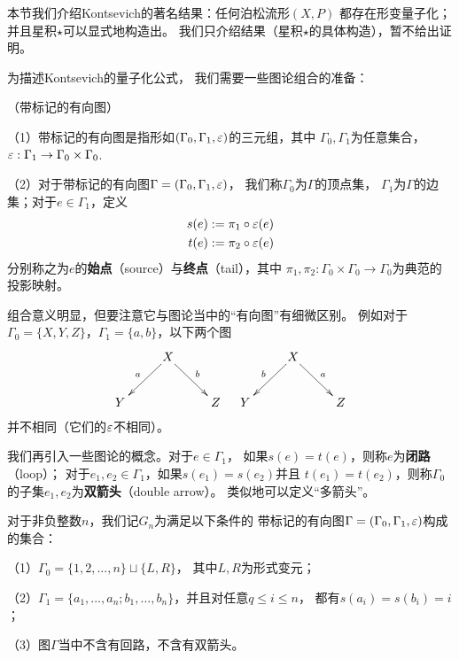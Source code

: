 本节我们介绍Kontsevich的著名结果：任何泊松流形$(X,P)$
都存在形变量子化；并且星积$\star$可以显式地构造出。
我们只介绍结果（星积$\star$的具体构造），暂不给出证明。


为描述Kontsevich的量子化公式，
我们需要一些图论组合的准备：

\begin{definition}（带标记的有向图）

（1）带标记的有向图是指形如$(\Gamma_0,\Gamma_1,\varepsilon)$的三元组，其中
$\Gamma_0,\Gamma_1$为任意集合，
$\varepsilon:\Gamma_1\to \Gamma_0\times \Gamma_0$.

（2）对于带标记的有向图$\Gamma=(\Gamma_0,\Gamma_1,\varepsilon)$，
我们称$\Gamma_0$为$\Gamma$的顶点集，
$\Gamma_1$为$\Gamma$的边集；对于$e\in \Gamma_1$，定义
\begin{eqnarray*}
s(e):=\pi_1\circ\varepsilon(e)\\
t(e):=\pi_2\circ\varepsilon(e)
\end{eqnarray*}
分别称之为$e$的\textbf{始点}（source）与\textbf{终点}（tail），其中
$\pi_1,\pi_2:\Gamma_0\times \Gamma_0\to \Gamma_0$为典范的投影映射。
\end{definition}

组合意义明显，但要注意它与图论当中的“有向图”有细微区别。
例如对于$\Gamma_0=\{X,Y,Z\}$，$\Gamma_1=\{a,b\}$，以下两个图
$$
  \xymatrix{
    &X\ar[dl]_{a}  \ar[dr]^b
    &
  \\
     Y
    &
    &Z
  }
\quad
  \xymatrix{
    &X\ar[dl]_{b}  \ar[dr]^a
    &
  \\
     Y
    &
    &Z
  }
$$
并不相同（它们的$\varepsilon$不相同）。

我们再引入一些图论的概念。对于$e\in \Gamma_1$，
如果$s(e)=t(e)$，则称$e$为\textbf{闭路}（loop）；
对于$e_1,e_2\in\Gamma_1$，如果$s(e_1)=s(e_2)$并且
$t(e_1)=t(e_2)$，则称$\Gamma_0$的子集${e_1,e_2}$为\textbf{双箭头}（double arrow）。
类似地可以定义“多箭头”。



\begin{notation}
对于非负整数$n$，我们记$G_n$为满足以下条件的
带标记的有向图$\Gamma=(\Gamma_0,\Gamma_1,\varepsilon)$构成的集合：

（1）$\Gamma_0=\{1,2,...,n\}\sqcup\{L,R\}$，
其中$L,R$为形式变元；

（2）$\Gamma_1=\{a_1,...,a_n;b_1,...,b_n\}$，并且对任意$q\leq i\leq n$，
都有$s(a_i)=s(b_i)=i$；

（3）图$\Gamma$当中不含有回路，不含有双箭头。
\end{notation}

